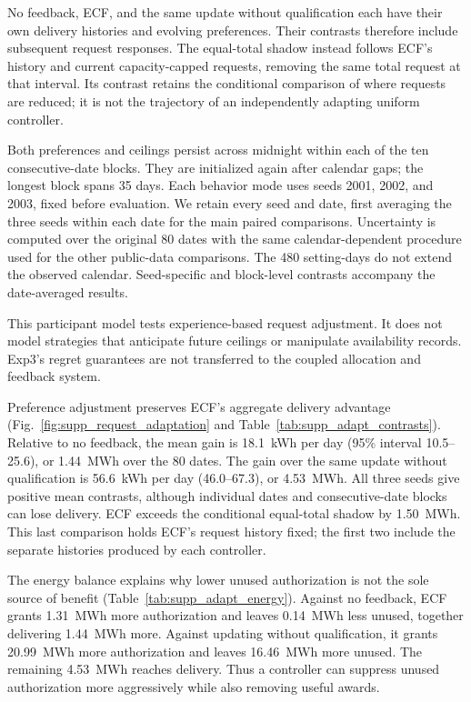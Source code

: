 \documentclass[11pt]{article}
\begin{document}
No feedback, ECF, and the same update without qualification each have their own
delivery histories and evolving preferences. Their contrasts therefore include
subsequent request responses. The equal-total shadow instead follows ECF's
history and current capacity-capped requests, removing the same total request at that
interval. Its contrast retains the conditional comparison of where requests
are reduced; it is not the trajectory of an independently adapting uniform
controller.

Both preferences and ceilings persist across midnight within each of the ten
consecutive-date blocks. They are initialized again after calendar gaps; the
longest block spans 35 days. Each behavior mode uses seeds 2001, 2002, and 2003,
fixed before evaluation. We retain every seed and date, first averaging the
three seeds within each date for the main paired comparisons. Uncertainty is
computed over the original 80 dates with the same calendar-dependent procedure
used for the other public-data comparisons. The 480 setting-days do not extend
the observed calendar. Seed-specific and block-level contrasts accompany the
date-averaged results.

This participant model tests experience-based request adjustment. It does not
model strategies that anticipate future ceilings or manipulate availability
records. Exp3's regret guarantees are not transferred to the coupled allocation
and feedback system.


Preference adjustment preserves ECF's aggregate delivery advantage
(Fig.~\ref{fig:supp_request_adaptation} and
Table~\ref{tab:supp_adapt_contrasts}). Relative to no feedback, the mean
gain is 18.1~kWh per day (95\% interval 10.5--25.6), or 1.44~MWh over the
80 dates. The gain over the same update without qualification is
56.6~kWh per day (46.0--67.3), or 4.53~MWh. All three seeds give positive
mean contrasts, although individual dates and consecutive-date blocks can
lose delivery. ECF exceeds the conditional equal-total shadow by
1.50~MWh. This last comparison holds ECF's request history fixed; the first
two include the separate histories produced by each controller.

The energy balance explains why lower unused authorization is not the sole
source of benefit (Table~\ref{tab:supp_adapt_energy}). Against no feedback,
ECF grants 1.31~MWh more authorization and leaves 0.14~MWh less unused,
together delivering 1.44~MWh more. Against updating without qualification,
it grants 20.99~MWh more authorization and leaves 16.46~MWh more unused.
The remaining 4.53~MWh reaches delivery. Thus a controller can suppress
unused authorization more aggressively while also removing useful awards.
\end{document}
